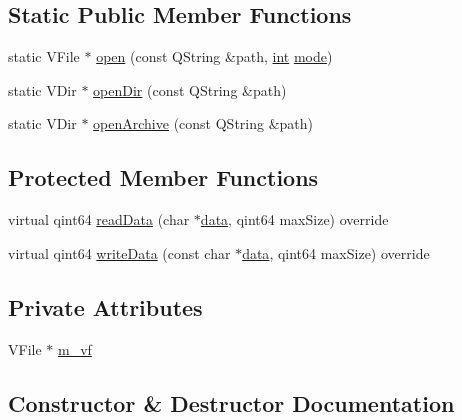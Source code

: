 \subsection*{Static Public Member Functions}
\begin{DoxyCompactItemize}
\item 
static V\+File $\ast$ \mbox{\hyperlink{class_q_g_b_a_1_1_v_file_device_adec7773d5ea263d2f4f6b0e46fcfd318}{open}} (const Q\+String \&path, \mbox{\hyperlink{ioapi_8h_a787fa3cf048117ba7123753c1e74fcd6}{int}} \mbox{\hyperlink{ioapi_8h_a7e43d41c2fe013a373b540cba02505cf}{mode}})
\item 
static V\+Dir $\ast$ \mbox{\hyperlink{class_q_g_b_a_1_1_v_file_device_a79750e0a06f29d76808607b0624b2e43}{open\+Dir}} (const Q\+String \&path)
\item 
static V\+Dir $\ast$ \mbox{\hyperlink{class_q_g_b_a_1_1_v_file_device_a1f9df0113536c0cc9ddab7a2a67b69f6}{open\+Archive}} (const Q\+String \&path)
\end{DoxyCompactItemize}
\subsection*{Protected Member Functions}
\begin{DoxyCompactItemize}
\item 
virtual qint64 \mbox{\hyperlink{class_q_g_b_a_1_1_v_file_device_a82e126f8a380ff4933c8f52c1625ca14}{read\+Data}} (char $\ast$\mbox{\hyperlink{libretro_8c_a735984d41155bc1032e09bece8f8d66d}{data}}, qint64 max\+Size) override
\item 
virtual qint64 \mbox{\hyperlink{class_q_g_b_a_1_1_v_file_device_a8f0c1f21080bb1587997d1c4e72cc1d8}{write\+Data}} (const char $\ast$\mbox{\hyperlink{libretro_8c_a735984d41155bc1032e09bece8f8d66d}{data}}, qint64 max\+Size) override
\end{DoxyCompactItemize}
\subsection*{Private Attributes}
\begin{DoxyCompactItemize}
\item 
V\+File $\ast$ \mbox{\hyperlink{class_q_g_b_a_1_1_v_file_device_a2792e1abd3bb07f7d504682dd3b0342a}{m\+\_\+vf}}
\end{DoxyCompactItemize}


\subsection{Constructor \& Destructor Documentation}
\mbox{\label{class_q_g_b_a_1_1_v_file_device_a272c76b9fc8dc547945f789c0cea68a4}} 
